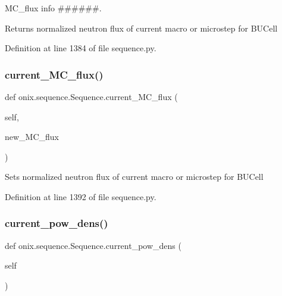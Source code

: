M\+C\+\_\+flux info \#\#\#\#\#\#. 

\begin{DoxyVerb}Returns normalized neutron flux of current macro or microstep
for BUCell\end{DoxyVerb}
 

Definition at line 1384 of file sequence.\+py.

\mbox{\label{classonix_1_1sequence_1_1Sequence_a03156799257935680217e9de5227cdd0}} 
\subsubsection{\texorpdfstring{current\+\_\+\+M\+C\+\_\+flux()}{current\_MC\_flux()}\hspace{0.1cm}{\footnotesize\ttfamily [2/2]}}
{\footnotesize\ttfamily def onix.\+sequence.\+Sequence.\+current\+\_\+\+M\+C\+\_\+flux (\begin{DoxyParamCaption}\item[{}]{self,  }\item[{}]{new\+\_\+\+M\+C\+\_\+flux }\end{DoxyParamCaption})}

\begin{DoxyVerb}Sets normalized neutron flux of current macro or microstep
for BUCell\end{DoxyVerb}
 

Definition at line 1392 of file sequence.\+py.

\mbox{\label{classonix_1_1sequence_1_1Sequence_a336f7f417a7ae1a62734e3729b58e25b}} 
\subsubsection{\texorpdfstring{current\+\_\+pow\+\_\+dens()}{current\_pow\_dens()}\hspace{0.1cm}{\footnotesize\ttfamily [1/2]}}
{\footnotesize\ttfamily def onix.\+sequence.\+Sequence.\+current\+\_\+pow\+\_\+dens (\begin{DoxyParamCaption}\item[{}]{self }\end{DoxyParamCaption})}



